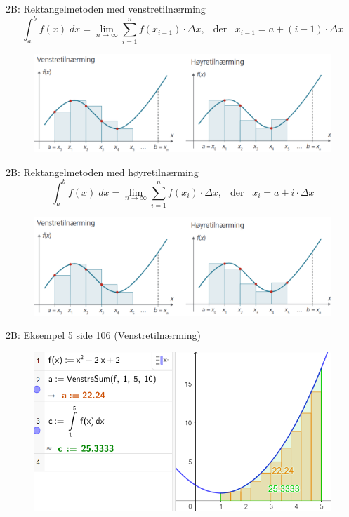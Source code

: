 \redheader
\begin{frame}{2B: Rektangelmetoden med venstretilnærming}
 \begin{equation*}
        \int_a^b f(x)\;dx=\lim_{n\rightarrow\infty}\sum_{i=1}^nf(x_{i-1})\cdot \Delta x, \:\;\; \text{der} \;\;\; x_{i-1}=a+(i-1)\cdot \Delta x
    \end{equation*}
    \begin{figure}
        \centering
   \includegraphics[width=\linewidth]{R2-K2B-2.png}
    \end{figure}
\end{frame}

\redheader
\begin{frame}{2B: Rektangelmetoden med høyretilnærming}
 \begin{equation*}
        \int_a^b f(x)\;dx=\lim_{n\rightarrow\infty}\sum_{i=1}^nf(x_{i})\cdot \Delta x, \:\;\; \text{der} \;\;\; x_{i}=a+i\cdot \Delta x
    \end{equation*}

     \begin{figure}
        \centering
   \includegraphics[width=\linewidth]{R2-K2B-2.png}
    \end{figure}
\end{frame}


\greenheader
\begin{frame}{2B: Eksempel 5 side 106 (Venstretilnærming)}
\begin{figure}
    \centering
    \includegraphics[width=\linewidth]{R2-K2B-3.png}
\end{figure}
\end{frame}

